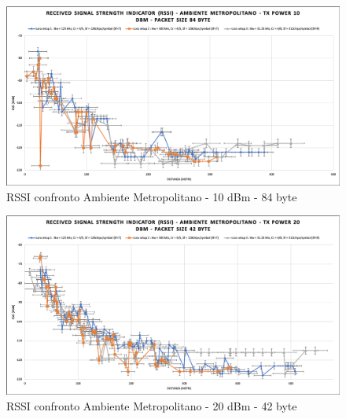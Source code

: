 \documentclass[12pt,a4paper,openright,twoside]{report}
\begin{document}
\begin{figure}[h]                      
\begin{center} 
\includegraphics[width=\textwidth]{RSSI_confronto_AM-10dBm-84byte.png}
\caption[RSSI confronto Ambiente Metropolitano - 10 dBm - 84 byte]{RSSI confronto Ambiente Metropolitano - 10 dBm - 84 byte}\label{fig:prima}
\end{center}
\end{figure}

\begin{figure}[h]                      
\begin{center} 
\includegraphics[width=\textwidth]{RSSI_confronto_AM-20dBm-42byte.png}
\caption[RSSI confronto Ambiente Metropolitano - 20 dBm - 42 byte]{RSSI confronto Ambiente Metropolitano - 20 dBm - 42 byte}\label{fig:prima}
\end{center}
\end{figure}
\end{document}
